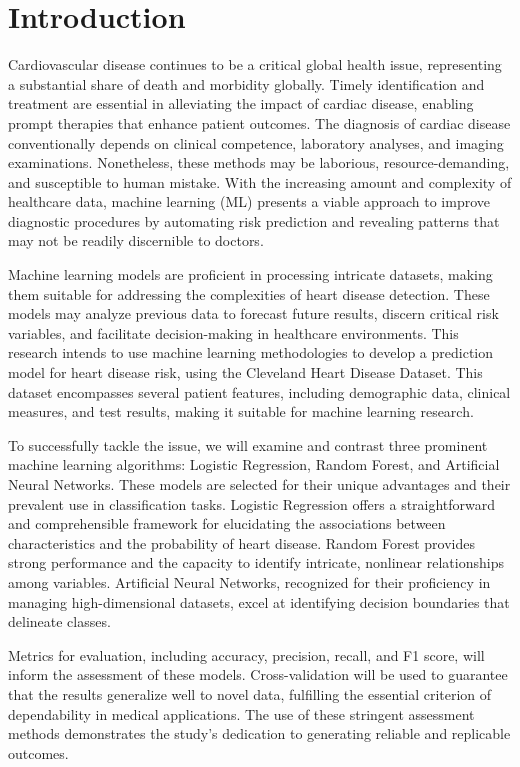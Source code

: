 
\section{Introduction}
Cardiovascular disease continues to be a critical global health issue, representing a substantial share of death and morbidity globally. Timely identification and treatment are essential in alleviating the impact of cardiac disease, enabling prompt therapies that enhance patient outcomes. The diagnosis of cardiac disease conventionally depends on clinical competence, laboratory analyses, and imaging examinations. Nonetheless, these methods may be laborious, resource-demanding, and susceptible to human mistake. With the increasing amount and complexity of healthcare data, machine learning (ML) presents a viable approach to improve diagnostic procedures by automating risk prediction and revealing patterns that may not be readily discernible to doctors.

Machine learning models are proficient in processing intricate datasets, making them suitable for addressing the complexities of heart disease detection. These models may analyze previous data to forecast future results, discern critical risk variables, and facilitate decision-making in healthcare environments. This research intends to use machine learning methodologies to develop a prediction model for heart disease risk, using the Cleveland Heart Disease Dataset. This dataset encompasses several patient features, including demographic data, clinical measures, and test results, making it suitable for machine learning research.

To successfully tackle the issue, we will examine and contrast three prominent machine learning algorithms: Logistic Regression, Random Forest, and Artificial Neural Networks. These models are selected for their unique advantages and their prevalent use in classification tasks. Logistic Regression offers a straightforward and comprehensible framework for elucidating the associations between characteristics and the probability of heart disease. Random Forest provides strong performance and the capacity to identify intricate, nonlinear relationships among variables. Artificial Neural Networks, recognized for their proficiency in managing high-dimensional datasets, excel at identifying decision boundaries that delineate classes.

Metrics for evaluation, including accuracy, precision, recall, and F1 score, will inform the assessment of these models. Cross-validation will be used to guarantee that the results generalize well to novel data, fulfilling the essential criterion of dependability in medical applications. The use of these stringent assessment methods demonstrates the study's dedication to generating reliable and replicable outcomes.


